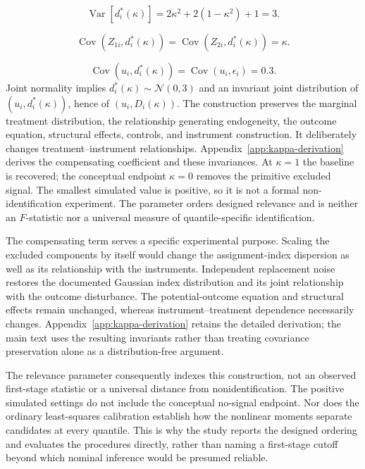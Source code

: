 \begin{equation}
  \operatorname{Var}\!\left[d_i^*(\kappa)\right]
  =2\kappa^2+2(1-\kappa^2)+1=3.
  \label{eq:dgp-kappa-variance}
\end{equation}

\begin{equation}
  \operatorname{Cov}\!\left(Z_{1i},d_i^*(\kappa)\right)
  =\operatorname{Cov}\!\left(Z_{2i},d_i^*(\kappa)\right)
  =\kappa.
  \label{eq:dgp-kappa-relevance}
\end{equation}

\begin{equation}
  \operatorname{Cov}\!\left(u_i,d_i^*(\kappa)\right)
  =\operatorname{Cov}(u_i,\epsilon_i)=0.3.
  \label{eq:dgp-kappa-endogeneity}
\end{equation}
Joint normality implies $d_i^*(\kappa)\sim\mathcal N(0,3)$ and an invariant joint distribution of $(u_i,d_i^*(\kappa))$, hence of $(u_i,D_i(\kappa))$. The construction preserves the marginal treatment distribution, the relationship generating endogeneity, the outcome equation, structural effects, controls, and instrument construction. It deliberately changes treatment--instrument relationships. Appendix~\ref{app:kappa-derivation} derives the compensating coefficient and these invariances. At $\kappa=1$ the baseline is recovered; the conceptual endpoint $\kappa=0$ removes the primitive excluded signal. The smallest simulated value is positive, so it is not a formal non-identification experiment. The parameter orders designed relevance and is neither an $F$-statistic nor a universal measure of quantile-specific identification.

The compensating term serves a specific experimental purpose. Scaling the excluded components by itself would change the assignment-index dispersion as well as its relationship with the instruments. Independent replacement noise restores the documented Gaussian index distribution and its joint relationship with the outcome disturbance. The potential-outcome equation and structural effects remain unchanged, whereas instrument--treatment dependence necessarily changes. Appendix~\ref{app:kappa-derivation} retains the detailed derivation; the main text uses the resulting invariants rather than treating covariance preservation alone as a distribution-free argument.

The relevance parameter consequently indexes this construction, not an observed first-stage statistic or a universal distance from nonidentification. The positive simulated settings do not include the conceptual no-signal endpoint. Nor does the ordinary least-squares calibration establish how the nonlinear moments separate candidates at every quantile. This is why the study reports the designed ordering and evaluates the procedures directly, rather than naming a first-stage cutoff beyond which nominal inference would be presumed reliable.

